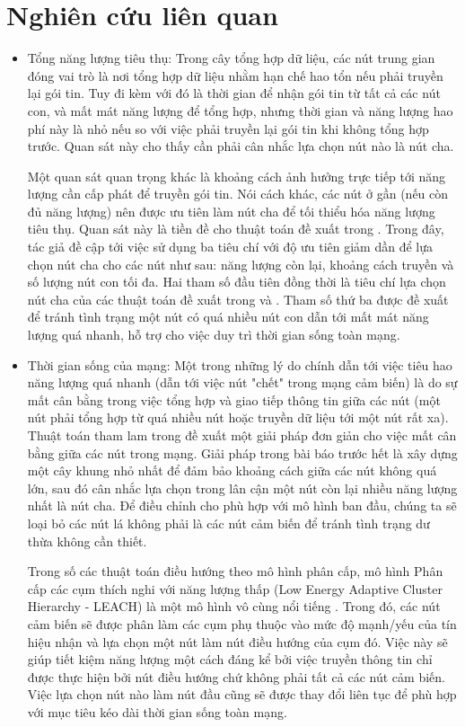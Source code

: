 \documentclass{hust}
\begin{document}
\section{Nghiên cứu liên quan}
\begin{itemize}
	\item Tổng năng lượng tiêu thụ: Trong cây tổng hợp dữ liệu, các nút trung gian đóng vai trò là nơi tổng hợp dữ liệu nhằm hạn chế hao tổn nếu phải truyền lại gói tin. Tuy đi kèm với đó là thời gian để nhận gói tin từ tất cả các nút con, và mất mát năng lượng để tổng hợp, nhưng thời gian và năng lượng hao phí này là nhỏ nếu so với việc phải truyền lại gói tin khi không tổng hợp trước. Quan sát này cho thấy cần phải cân nhắc lựa chọn nút nào là nút cha.
	
	
	Một quan sát quan trọng khác là khoảng cách ảnh hưởng trực tiếp tới năng lượng cần cấp phát để truyền gói tin. Nói cách khác, các nút ở gần (nếu còn đủ năng lượng) nên được ưu tiên làm nút cha để tối thiểu hóa năng lượng tiêu thụ. Quan sát này là tiền đề cho thuật toán đề xuất trong \cite{eskandari2008energy}. Trong đây, tác giả đề cập tới việc sử dụng ba tiêu chí với độ ưu tiên giảm dần để lựa chọn nút cha cho các nút như sau: năng lượng còn lại, khoảng cách truyền và số lượng nút con tối đa. Hai tham số đầu tiên đồng thời là tiêu chí lựa chọn nút cha của các thuật toán đề xuất trong \cite{lee2005energy} và \cite{lee2005lpt}. Tham số thứ ba được đề xuất để tránh tình trạng một nút có quá nhiều nút con dẫn tới mất mát năng lượng quá nhanh, hỗ trợ cho việc duy trì thời gian sống toàn mạng.
	
	\item Thời gian sống của mạng: Một trong những lý do chính dẫn tới việc tiêu hao năng lượng quá nhanh (dẫn tới việc nút "chết" trong mạng cảm biến) là do sự mất cân bằng trong việc tổng hợp và giao tiếp thông tin giữa các nút (một nút phải tổng hợp từ quá nhiều nút hoặc truyền dữ liệu tới một nút rất xa). Thuật toán tham lam trong \cite{liu2019heuristic} đề xuất một giải pháp đơn giản cho việc mất cân bằng giữa các nút trong mạng. Giải pháp trong bài báo trước hết là xây dựng một cây khung nhỏ nhất để đảm bảo khoảng cách giữa các nút không quá lớn, sau đó cân nhắc lựa chọn trong lân cận một nút còn lại nhiều năng lượng nhất là nút cha. Để điều chỉnh cho phù hợp với mô hình ban đầu, chúng ta sẽ loại bỏ các nút lá không phải là các nút cảm biến để tránh tình trạng dư thừa không cần thiết.
	
	
	Trong số các thuật toán điều hướng theo mô hình phân cấp, mô hình Phân cấp các cụm thích nghi với năng lượng thấp (Low Energy Adaptive Cluster Hierarchy - LEACH) là một mô hình vô cùng nổi tiếng \cite{heinzelman2000energy}. Trong đó, các nút cảm biến sẽ được phân làm các cụm phụ thuộc vào mức độ mạnh/yếu của tín hiệu nhận và lựa chọn một nút làm nút điều hướng của cụm đó. Việc này sẽ giúp tiết kiệm năng lượng một cách đáng kể bởi việc truyền thông tin chỉ được thực hiện bởi nút điều hướng chứ không phải tất cả các nút cảm biến. Việc lựa chọn nút nào làm nút đầu cũng sẽ được thay đổi liên tục để phù hợp với mục tiêu kéo dài thời gian sống toàn mạng.
	

\end{itemize}
\end{document}
